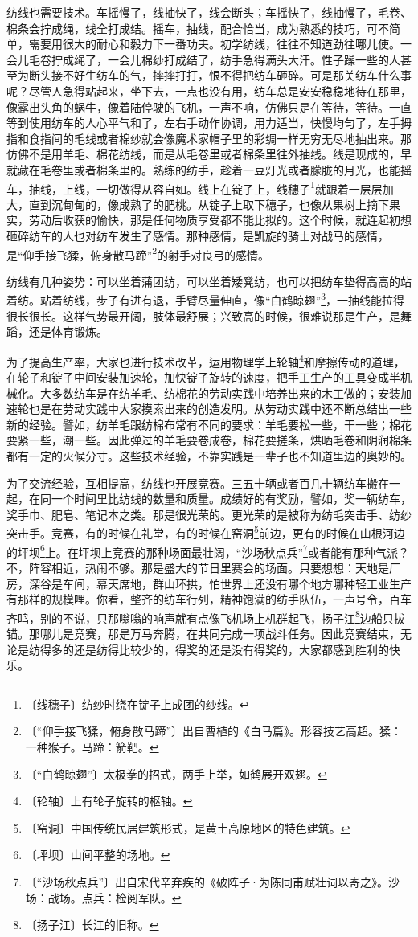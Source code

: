 \documentclass[12pt,UTF-8,openany]{ctexbook}
\begin{document}
\begin{large}
    纺线也需要技术。车摇慢了，线抽快了，线会断头；车摇快了，线抽慢了，毛卷、棉条会拧成绳，线全打成结。摇车，抽线，配合恰当，成为熟悉的技巧，可不简单，需要用很大的耐心和毅力下一番功夫。初学纺线，往往不知道劲往哪儿使。一会儿毛卷拧成绳了，一会儿棉纱打成结了，纺手急得满头大汗。性子躁一些的人甚至为断头接不好生纺车的气，摔摔打打，恨不得把纺车砸碎。可是那关纺车什么事呢？尽管人急得站起来，坐下去，一点也没有用，纺车总是安安稳稳地待在那里，像露出头角的蜗牛，像着陆停驶的飞机，一声不响，仿佛只是在等待，等待。一直等到使用纺车的人心平气和了，左右手动作协调，用力适当，快慢均匀了，左手拇指和食指间的毛线或者棉纱就会像魔术家帽子里的彩绸一样无穷无尽地抽出来。那仿佛不是用羊毛、棉花纺线，而是从毛卷里或者棉条里往外抽线。线是现成的，早就藏在毛卷里或者棉条里的。熟练的纺手，趁着一豆灯光或者朦胧的月光，也能摇车，抽线，上线，一切做得从容自如。线上在锭子上，线穗子\footnote{〔线穗子〕纺纱时绕在锭子上成团的纱线。}就跟着一层层加大，直到沉甸甸的，像成熟了的肥桃。从锭子上取下穗子，也像从果树上摘下果实，劳动后收获的愉快，那是任何物质享受都不能比拟的。这个时候，就连起初想砸碎纺车的人也对纺车发生了感情。那种感情，是凯旋的骑士对战马的感情，是“仰手接飞猱，俯身散马蹄”\footnote{〔“仰手接飞猱，俯身散马蹄”〕出自曹植的《白马篇》。形容技艺高超。猱：一种猴子。马蹄：箭靶。}的射手对良弓的感情。
    
    纺线有几种姿势：可以坐着蒲团纺，可以坐着矮凳纺，也可以把纺车垫得高高的站着纺。站着纺线，步子有进有退，手臂尽量伸直，像“白鹤晾翅”\footnote{〔“白鹤晾翅”〕太极拳的招式，两手上举，如鹤展开双翅。}，一抽线能拉得很长很长。这样气势最开阔，肢体最舒展；兴致高的时候，很难说那是生产，是舞蹈，还是体育锻炼。
    
    为了提高生产率，大家也进行技术改革，运用物理学上轮轴\footnote{〔轮轴〕上有轮子旋转的枢轴。}和摩擦传动的道理，在轮子和锭子中间安装加速轮，加快锭子旋转的速度，把手工生产的工具变成半机械化。大多数纺车是在纺羊毛、纺棉花的劳动实践中培养出来的木工做的；安装加速轮也是在劳动实践中大家摸索出来的创造发明。从劳动实践中还不断总结出一些新的经验。譬如，纺羊毛跟纺棉布常有不同的要求：羊毛要松一些，干一些；棉花要紧一些，潮一些。因此弹过的羊毛要卷成卷，棉花要搓条，烘晒毛卷和阴润棉条都有一定的火候分寸。这些技术经验，不靠实践是一辈子也不知道里边的奥妙的。
    
    为了交流经验，互相提高，纺线也开展竞赛。三五十辆或者百几十辆纺车搬在一起，在同一个时间里比纺线的数量和质量。成绩好的有奖励，譬如，奖一辆纺车，奖手巾、肥皂、笔记本之类。那是很光荣的。更光荣的是被称为纺毛突击手、纺纱突击手。竞赛，有的时候在礼堂，有的时候在窑洞\footnote{〔窑洞〕中国传统民居建筑形式，是黄土高原地区的特色建筑。}前边，更有的时候在山根河边的坪坝\footnote{〔坪坝〕山间平整的场地。}上。在坪坝上竞赛的那种场面最壮阔，“沙场秋点兵”\footnote{〔“沙场秋点兵”〕出自宋代辛弃疾的《破阵子·为陈同甫赋壮词以寄之》。沙场：战场。点兵：检阅军队。}或者能有那种气派？不，阵容相近，热闹不够。那是盛大的节日里赛会的场面。只要想想：天地是厂房，深谷是车间，幕天席地，群山环拱，怕世界上还没有哪个地方哪种轻工业生产有那样的规模哩。你看，整齐的纺车行列，精神饱满的纺手队伍，一声号令，百车齐鸣，别的不说，只那嗡嗡的响声就有点像飞机场上机群起飞，扬子江\footnote{〔扬子江〕长江的旧称。}边船只拔锚。那哪儿是竞赛，那是万马奔腾，在共同完成一项战斗任务。因此竞赛结束，无论是纺得多的还是纺得比较少的，得奖的还是没有得奖的，大家都感到胜利的快乐。
    

\end{large}
\end{document}
